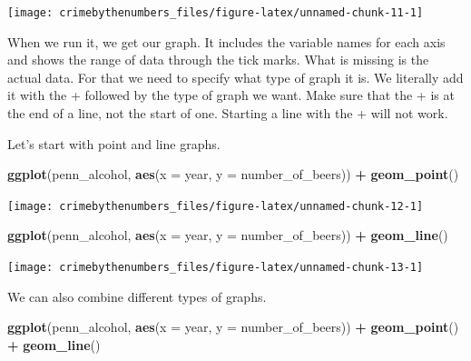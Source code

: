 \documentclass[
  12pt,
]{book}
\newenvironment{Shaded}{\begin{snugshade}}{\end{snugshade}}
\newcommand{\DataTypeTok}[1]{\textcolor[rgb]{0.27,0.27,0.27}{#1}}
\newcommand{\KeywordTok}[1]{\textcolor[rgb]{0.27,0.27,0.27}{\textbf{#1}}}
\newcommand{\NormalTok}[1]{#1}
\newcommand{\OperatorTok}[1]{\textcolor[rgb]{0.43,0.43,0.43}{\textbf{#1}}}
\newcommand{\StringTok}[1]{\textcolor[rgb]{0.5,0.5,0.5}{#1}}
\begin{document}
\begin{center}\texttt{[image: crimebythenumbers\_files/figure-latex/unnamed-chunk-11-1]} \end{center}

When we run it, we get our graph. It includes the variable names for each axis and shows the range of data through the tick marks. What is missing is the actual data. For that we need to specify what type of graph it is. We literally add it with the + followed by the type of graph we want. Make sure that the + is at the end of a line, not the start of one. Starting a line with the + will not work.

Let's start with point and line graphs.

\begin{Shaded}
\begin{Highlighting}[]
\KeywordTok{ggplot}\NormalTok{(penn\_alcohol, }\KeywordTok{aes}\NormalTok{(}\DataTypeTok{x =}\NormalTok{ year, }\DataTypeTok{y =}\NormalTok{ number\_of\_beers)) }\OperatorTok{+}
\StringTok{  }\KeywordTok{geom\_point}\NormalTok{()}
\end{Highlighting}
\end{Shaded}

\begin{center}\texttt{[image: crimebythenumbers\_files/figure-latex/unnamed-chunk-12-1]} \end{center}

\begin{Shaded}
\begin{Highlighting}[]
\KeywordTok{ggplot}\NormalTok{(penn\_alcohol, }\KeywordTok{aes}\NormalTok{(}\DataTypeTok{x =}\NormalTok{ year, }\DataTypeTok{y =}\NormalTok{ number\_of\_beers)) }\OperatorTok{+}
\StringTok{  }\KeywordTok{geom\_line}\NormalTok{()}
\end{Highlighting}
\end{Shaded}

\begin{center}\texttt{[image: crimebythenumbers\_files/figure-latex/unnamed-chunk-13-1]} \end{center}

We can also combine different types of graphs.

\begin{Shaded}
\begin{Highlighting}[]
\KeywordTok{ggplot}\NormalTok{(penn\_alcohol, }\KeywordTok{aes}\NormalTok{(}\DataTypeTok{x =}\NormalTok{ year, }\DataTypeTok{y =}\NormalTok{ number\_of\_beers)) }\OperatorTok{+}
\StringTok{  }\KeywordTok{geom\_point}\NormalTok{() }\OperatorTok{+}
\StringTok{  }\KeywordTok{geom\_line}\NormalTok{()}
\end{Highlighting}
\end{Shaded}
\end{document}
